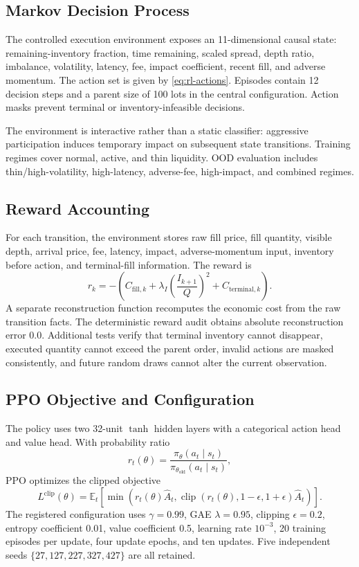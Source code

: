\documentclass[journal,10pt]{IEEEtran}
\newcommand{\E}{\mathbb{E}}
\newcommand{\1}{\mathbf{1}}
\newcommand{\clip}{\operatorname{clip}}
\begin{document}
\subsection{Markov Decision Process}
The controlled execution environment exposes an 11-dimensional causal state: remaining-inventory fraction, time remaining, scaled spread, depth ratio, imbalance, volatility, latency, fee, impact coefficient, recent fill, and adverse momentum. The action set is given by \cref{eq:rl-actions}. Episodes contain 12 decision steps and a parent size of 100 lots in the central configuration. Action masks prevent terminal or inventory-infeasible decisions.

The environment is interactive rather than a static classifier: aggressive participation induces temporary impact on subsequent state transitions. Training regimes cover normal, active, and thin liquidity. OOD evaluation includes thin/high-volatility, high-latency, adverse-fee, high-impact, and combined regimes.

\subsection{Reward Accounting}
For each transition, the environment stores raw fill price, fill quantity, visible depth, arrival price, fee, latency, impact, adverse-momentum input, inventory before action, and terminal-fill information. The reward is
\begin{equation}
r_k=-\left(C_{\mathrm{fill},k}+\lambda_I\left(\frac{I_{k+1}}{Q}\right)^2+C_{\mathrm{terminal},k}\right).
\label{eq:reward}
\end{equation}
A separate reconstruction function recomputes the economic cost from the raw transition facts. The deterministic reward audit obtains absolute reconstruction error 0.0. Additional tests verify that terminal inventory cannot disappear, executed quantity cannot exceed the parent order, invalid actions are masked consistently, and future random draws cannot alter the current observation.

\subsection{PPO Objective and Configuration}
The policy uses two 32-unit $\tanh$ hidden layers with a categorical action head and value head. With probability ratio
\begin{equation}
r_t(\theta)=\frac{\pi_\theta(a_t\mid s_t)}{\pi_{\theta_{\mathrm{old}}}(a_t\mid s_t)},
\end{equation}
PPO optimizes the clipped objective \cite{SchulmanWolskiDhariwalRadfordKlimov2017}
\begin{equation}
L^{\mathrm{clip}}(\theta)=\E_t\left[\min\left(r_t(\theta)\hat A_t,\clip(r_t(\theta),1-\epsilon,1+\epsilon)\hat A_t\right)\right].
\label{eq:ppo}
\end{equation}
The registered configuration uses $\gamma=0.99$, GAE $\lambda=0.95$, clipping $\epsilon=0.2$, entropy coefficient 0.01, value coefficient 0.5, learning rate $10^{-3}$, 20 training episodes per update, four update epochs, and ten updates. Five independent seeds $\{27,127,227,327,427\}$ are all retained.
\end{document}
